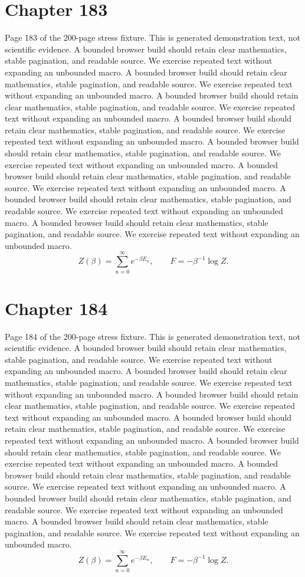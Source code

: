 \documentclass[11pt]{article}
\begin{document}
\section*{Chapter 183}
Page 183 of the 200-page stress fixture. This is generated demonstration text, not scientific evidence.
A bounded browser build should retain clear mathematics, stable pagination, and readable source. We exercise repeated text without expanding an unbounded macro.
A bounded browser build should retain clear mathematics, stable pagination, and readable source. We exercise repeated text without expanding an unbounded macro.
A bounded browser build should retain clear mathematics, stable pagination, and readable source. We exercise repeated text without expanding an unbounded macro.
A bounded browser build should retain clear mathematics, stable pagination, and readable source. We exercise repeated text without expanding an unbounded macro.
A bounded browser build should retain clear mathematics, stable pagination, and readable source. We exercise repeated text without expanding an unbounded macro.
A bounded browser build should retain clear mathematics, stable pagination, and readable source. We exercise repeated text without expanding an unbounded macro.
A bounded browser build should retain clear mathematics, stable pagination, and readable source. We exercise repeated text without expanding an unbounded macro.
A bounded browser build should retain clear mathematics, stable pagination, and readable source. We exercise repeated text without expanding an unbounded macro.
\[Z(\beta)=\sum_{n=0}^{\infty}e^{-\beta E_n},\qquad F=-\beta^{-1}\log Z.\]
\newpage
\section*{Chapter 184}
Page 184 of the 200-page stress fixture. This is generated demonstration text, not scientific evidence.
A bounded browser build should retain clear mathematics, stable pagination, and readable source. We exercise repeated text without expanding an unbounded macro.
A bounded browser build should retain clear mathematics, stable pagination, and readable source. We exercise repeated text without expanding an unbounded macro.
A bounded browser build should retain clear mathematics, stable pagination, and readable source. We exercise repeated text without expanding an unbounded macro.
A bounded browser build should retain clear mathematics, stable pagination, and readable source. We exercise repeated text without expanding an unbounded macro.
A bounded browser build should retain clear mathematics, stable pagination, and readable source. We exercise repeated text without expanding an unbounded macro.
A bounded browser build should retain clear mathematics, stable pagination, and readable source. We exercise repeated text without expanding an unbounded macro.
A bounded browser build should retain clear mathematics, stable pagination, and readable source. We exercise repeated text without expanding an unbounded macro.
A bounded browser build should retain clear mathematics, stable pagination, and readable source. We exercise repeated text without expanding an unbounded macro.
\[Z(\beta)=\sum_{n=0}^{\infty}e^{-\beta E_n},\qquad F=-\beta^{-1}\log Z.\]
\newpage
\end{document}
